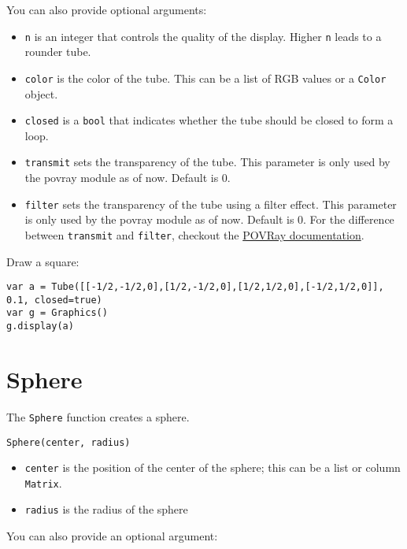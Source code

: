 You can also provide optional arguments:

\begin{itemize}

\item
  \texttt{n} is an integer that controls the quality of the display.
  Higher \texttt{n} leads to a rounder tube.
\item
  \texttt{color} is the color of the tube. This can be a list of RGB
  values or a \texttt{Color} object.
\item
  \texttt{closed} is a \texttt{bool} that indicates whether the tube
  should be closed to form a loop.
\item
  \texttt{transmit} sets the transparency of the tube. This parameter is
  only used by the povray module as of now. Default is 0.
\item
  \texttt{filter} sets the transparency of the tube using a filter
  effect. This parameter is only used by the povray module as of now.
  Default is 0. For the difference between \texttt{transmit} and
  \texttt{filter}, checkout the
  \href{http://xahlee.info/3d/povray-glassy.html}{POVRay documentation}.
\end{itemize}

Draw a square:

\begin{lstlisting}
var a = Tube([[-1/2,-1/2,0],[1/2,-1/2,0],[1/2,1/2,0],[-1/2,1/2,0]], 0.1, closed=true)
var g = Graphics()
g.display(a)
\end{lstlisting}

\hypertarget{sphere}{%
\section{Sphere}\label{sphere}}

The \texttt{Sphere} function creates a sphere.

\begin{lstlisting}
Sphere(center, radius)
\end{lstlisting}

\begin{itemize}

\item
  \texttt{center} is the position of the center of the sphere; this can
  be a list or column \texttt{Matrix}.
\item
  \texttt{radius} is the radius of the sphere
\end{itemize}

You can also provide an optional argument:


